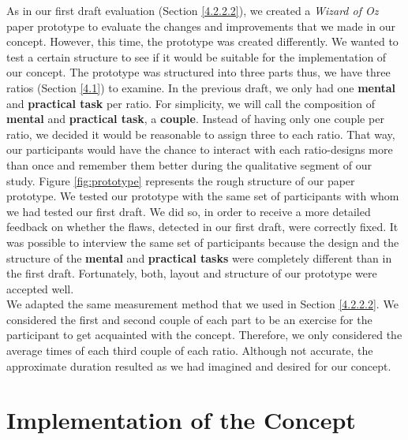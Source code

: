 As in our first draft evaluation (Section \ref{4.2.2.2}), we created a \textit{Wizard of Oz} paper prototype \cite{Butz2014} to evaluate the changes and improvements that we made in our concept. However, this time, the prototype was created differently. We wanted to test a certain structure to see if it would be suitable for the implementation of our concept. The prototype was structured into three parts thus, we have three ratios (Section \ref{4.1}) to examine. In the previous draft, we only had one \textbf{mental} and \textbf{practical task} per ratio. For simplicity, we will call the composition of \textbf{mental} and \textbf{practical task}, a \textbf{couple}. Instead of having only one couple per ratio, we decided it would be reasonable to assign three to each ratio. That way, our participants would have the chance to interact with each ratio-designs more than once and remember them better during the qualitative segment of our study. Figure \ref{fig:prototype} represents the rough structure of our paper prototype. We tested our prototype with the same set of participants with whom we had tested our first draft. We did so, in order to receive a more detailed feedback on whether the flaws, detected in our first draft, were correctly fixed. It was possible to interview the same set of participants because the design and the structure of the \textbf{mental} and \textbf{practical tasks} were completely different than in the first draft. Fortunately, both, layout and structure of our prototype were accepted well. \\

We adapted the same measurement method that we used in Section \ref{4.2.2.2}. We considered the first and second couple of each part to be an exercise for the participant to get acquainted with the concept. Therefore, we only considered the average times of each third couple of each ratio. Although not accurate, the approximate duration resulted as we had imagined and desired for our concept.

\section{Implementation of the Concept} \label{4.3}



